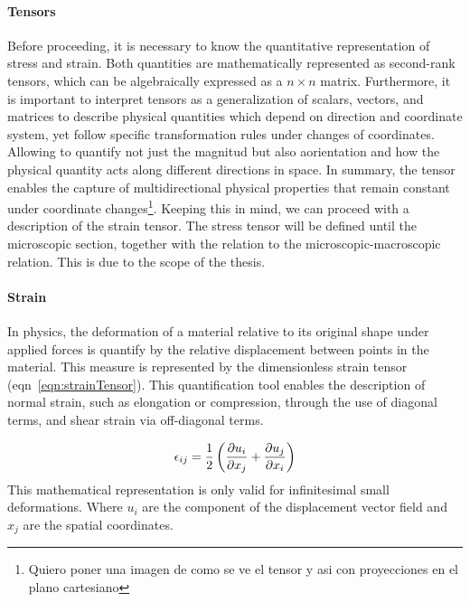 \paragraph{Tensors} Before proceeding, it is necessary to know the quantitative representation of stress and strain.
Both quantities are mathematically represented as second-rank tensors, which can be algebraically expressed as a $n\times n$ matrix.
Furthermore, it is important to interpret tensors as a generalization of scalars, vectors, and matrices to describe physical quantities which depend on direction and coordinate system, yet follow specific transformation rules under changes of coordinates.
Allowing to quantify not just the magnitud but also aorientation and how the physical quantity acts along different directions in space.
In summary, the tensor enables the capture of multidirectional physical properties that remain constant under coordinate changes\footnote{Quiero poner una imagen de como se ve el tensor y asi con proyecciones en el plano cartesiano}.
Keeping this in mind, we can proceed with a description of the strain tensor. The stress tensor will be defined until the microscopic section, together with the relation to the microscopic-macroscopic relation.
This is due to the scope of the thesis.

\paragraph{Strain} In physics, the deformation of a material relative to its original shape under applied forces is quantify by the relative displacement between points in the material.
This measure is represented by the dimensionless strain tensor (eqn~\eqref{eqn:strainTensor}).
This quantification tool enables the description of normal strain, such as elongation or compression, through the use of diagonal terms, and shear strain via off-diagonal terms.

\begin{gather}
    \epsilon_{ij} = \frac{1}{2}\left( \pdv{u_i}{x_j}+\pdv{u_j}{x_i} \right)\label{eqn:strainTensor}
\end{gather}
This mathematical representation is only valid for infinitesimal small deformations.
Where $u_i$ are the component of the displacement vector field and $x_j$ are the spatial coordinates.


